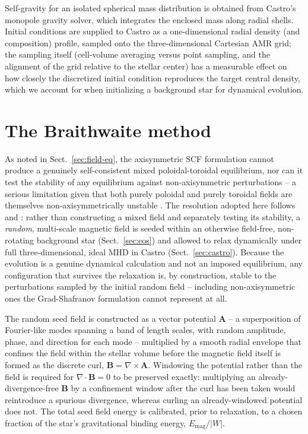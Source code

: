 \documentclass{aa}
\begin{document}
Self-gravity for an isolated spherical mass distribution is obtained
from Castro's monopole gravity solver, which integrates the enclosed
mass along radial shells. Initial conditions are supplied to Castro as
a one-dimensional radial density (and composition) profile, sampled
onto the three-dimensional Cartesian AMR grid; the sampling itself
(cell-volume averaging versus point sampling, and the alignment of the
grid relative to the stellar center) has a measurable effect on how
closely the discretized initial condition reproduces the target central
density, which we account for when initializing a background star for
dynamical evolution.


\section{The Braithwaite method}
\label{sec:braithwaite}

As noted in Sect.~\ref{sec:field-eq}, the axisymmetric SCF formulation
cannot produce a genuinely self-consistent mixed poloidal-toroidal
equilibrium, nor can it test the stability of any equilibrium against
non-axisymmetric perturbations -- a serious limitation given that both
purely poloidal and purely toroidal fields are themselves
non-axisymmetrically unstable \citep{tayler1973,markey1973}. The
resolution adopted here follows \citet{braithwaite2004} and
\citet{braithwaite2006}: rather than constructing a mixed field and
separately testing its stability, a \emph{random}, multi-scale magnetic
field is seeded within an otherwise field-free, non-rotating background
star (Sect.~\ref{sec:eos}) and allowed to relax dynamically under full
three-dimensional, ideal MHD in Castro (Sect.~\ref{sec:castro}). Because
the evolution is a genuine dynamical calculation and not an imposed
equilibrium, any configuration that survives the relaxation is, by
construction, stable to the perturbations sampled by the initial random
field -- including non-axisymmetric ones the Grad-Shafranov formulation
cannot represent at all.

The random seed field is constructed as a vector potential $\mathbf{A}$
-- a superposition of Fourier-like modes spanning a band of length
scales, with random amplitude, phase, and direction for each mode --
multiplied by a smooth radial envelope that confines the field within
the stellar volume before the magnetic field itself is formed as the
discrete curl, $\mathbf{B} = \nabla\times\mathbf{A}$. Windowing the
potential rather than the field is required for
$\nabla\!\cdot\!\mathbf{B}=0$ to be preserved exactly: multiplying an
already-divergence-free $\mathbf{B}$ by a confinement window after the
curl has been taken would reintroduce a spurious divergence, whereas
curling an already-windowed potential does not. The total seed field
energy is calibrated, prior to relaxation, to a chosen fraction of the
star's gravitational binding energy, $E_{\mathrm{mag}}/|W|$.
\end{document}
